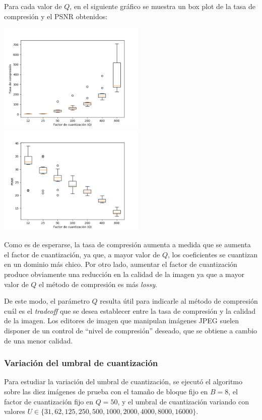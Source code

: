 \documentclass{article}
\newcommand{\set}[1]{\{#1\}}
\begin{document}
Para cada valor de $Q$, en el siguiente gráfico se muestra un
box plot de la tasa de compresión y el PSNR obtenidos:\\
\begin{center}
\includegraphics[width=7cm]{../imgs/output/gray_plots/q_rate.png}
\includegraphics[width=7cm]{../imgs/output/gray_plots/q_psnr.png}
\end{center}

Como es de esperarse, la tasa de compresión aumenta a medida que
se aumenta el factor de cuantización, ya que, a mayor valor de $Q$,
los coeficientes se cuantizan en un dominio más chico.
Por otro lado, aumentar el factor de cuantización produce obviamente
una reducción en la calidad de la imagen ya que a mayor valor de $Q$
el método de compresión es más {\em lossy}.

De este modo, el parámetro $Q$ resulta útil para indicarle al método
de compresión cuál es el {\em tradeoff} que se desea establecer entre
la tasa de compresión y la calidad de la imagen.
Los editores de imagen que manipulan imágenes JPEG suelen
disponer de un control de ``nivel de compresión'' deseado, que
se obtiene a cambio de una menor calidad.

\subsubsection{Variación del umbral de cuantización}

Para estudiar la variación del umbral de cuantización, se ejecutó el
algoritmo sobre las diez imágenes de prueba con el
tamaño de bloque fijo en $B = 8$,
el factor de cuantización fijo en $Q = 50$,
y el umbral de cuantización variando con valores
$U \in \set{31, 62, 125, 250, 500, 1000, 2000, 4000, 8000, 16000}$.
\end{document}
